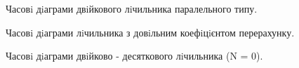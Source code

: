 \documentclass[a4paper,14pt]{extreport}
\begin{document}
\begin{figure}[h!]
	\caption{Часовi дiаграми двiйкового лiчильника паралельного типу.} 
\end{figure}

\begin{figure}[h!]
	\caption{ Часовi дiаграми лiчильника з довiльним коефiцiєнтом перерахунку.}
\end{figure}

\begin{figure}[h!]
	\caption{Часовi дiаграми двiйково - десяткового лiчильника (N = 0).} 
\end{figure}
\end{document}
